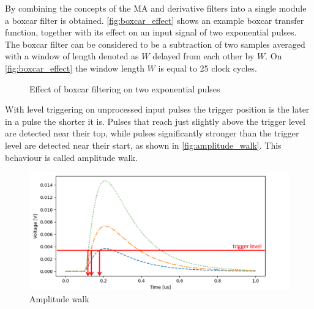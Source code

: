 By combining the concepts of the MA and derivative filters
into a single module a boxcar filter is obtained. 
\autoref{fig:boxcar_effect} shows an example boxcar transfer function,
together with its effect on an input signal of two exponential pulses.
The boxcar filter can be considered
to be a subtraction of two samples averaged with a window
of length denoted as $W$ delayed from each other by $W$. 
On \autoref{fig:boxcar_effect} the window length $W$ is equal to 25 clock cycles.
\begin{figure}[H]


\caption{Effect of boxcar filtering on two exponential pulses}
\label{fig:boxcar_effect} 
\end{figure}

With level triggering
on unprocessed input pulses the trigger position is the later in a pulse the 
shorter it is. Pulses that reach just slightly above the trigger level
are detected near their top, while pulses significantly stronger
than the trigger level are detected near their start, as shown in 
\autoref{fig:amplitude_walk}. This behaviour is called amplitude walk.

\begin{figure}[H]
  \centering
  \includegraphics[width=\linewidth]{media/amplitude_walk.png}
  \caption{Amplitude walk}
  \label{fig:amplitude_walk} 
\end{figure}



